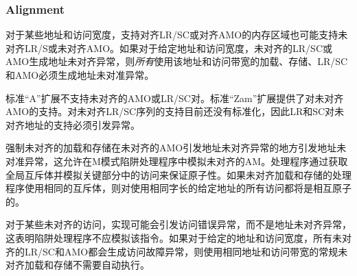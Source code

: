 {\subsubsection{Alignment}

\iffalse
Memory regions that support aligned LR/SC or aligned AMOs might also support
misaligned LR/SC or misaligned AMOs for some addresses and access widths.  If,
for a given address and access width, a misaligned LR/SC or AMO generates
an address-misaligned exception, then {\em all} loads, stores, LRs/SCs, and
AMOs using that address and access width must generate address-misaligned
exceptions.
\fi
对于某些地址和访问宽度，支持对齐LR/SC或对齐AMO的内存区域也可能支持未对齐LR/S或未对齐AMO。如果对于给定地址和访问宽度，未对齐的LR/SC或AMO生成地址未对齐异常，则{\em 所有}使用该地址和访问带宽的加载、存储、LR/SC和AMO必须生成地址未对准异常。

\iffalse
\begin{commentary}
The standard ``A'' extension does not support misaligned AMOs or LR/SC pairs.
Support for misaligned AMOs is provided by the standard ``Zam'' extension.
Support for misaligned LR/SC sequences is not currently standardized,
so LR and SC to misaligned addresses must raise an exception.

Mandating that misaligned loads and stores raise address-misaligned exceptions
wherever misaligned AMOs raise address-misaligned exceptions permits the
emulation of misaligned AMOs in an M-mode trap handler.  The handler
guarantees atomicity by acquiring a global mutex and emulating the access
within the critical section.  Provided that the handler for misaligned loads
and stores uses the same mutex, all accesses to a given address that use the
same word size will be mutually atomic.
\end{commentary}
\fi
\begin{commentary}
标准“A”扩展不支持未对齐的AMO或LR/SC对。标准“Zam”扩展提供了对未对齐AMO的支持。对未对齐LR/SC序列的支持目前还没有标准化，因此LR和SC对未对齐地址的支持必须引发异常。

强制未对齐的加载和存储在未对齐的AMO引发地址未对齐异常的地方引发地址未对准异常，这允许在M模式陷阱处理程序中模拟未对齐的AM。处理程序通过获取全局互斥体并模拟关键部分中的访问来保证原子性。如果未对齐加载和存储的处理程序使用相同的互斥体，则对使用相同字长的给定地址的所有访问都将是相互原子的。
\end{commentary}

\iffalse
Implementations may raise access-fault exceptions instead of address-misaligned
exceptions for some misaligned accesses, indicating the instruction should not
be emulated by a trap handler.  If, for a given address and access width, all
misaligned LRs/SCs and AMOs generate access-fault exceptions, then regular
misaligned loads and stores using the same address and access width are not
required to execute atomically.
\fi
对于某些未对齐的访问，实现可能会引发访问错误异常，而不是地址未对齐异常，这表明陷阱处理程序不应模拟该指令。如果对于给定的地址和访问宽度，所有未对齐的LR/SC和AMO都会生成访问故障异常，则使用相同地址和访问带宽的常规未对齐加载和存储不需要自动执行。


}
